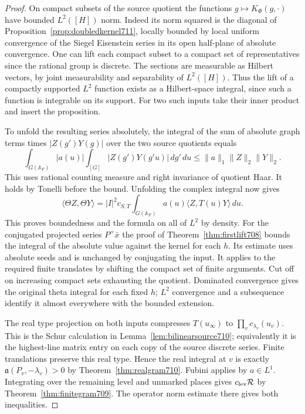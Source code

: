 \documentclass[a4paper,11pt]{article}
\theoremstyle{definition}
\theoremstyle{remark}
\numberwithin{equation}{section}
\begin{document}
\begin{proof}
On compact subsets of the source quotient the functions
\(g\mapsto K_\Phi(g,\cdot)\) have bounded \(L^2([H])\)
norm. Indeed its norm squared is the diagonal of
Proposition~\ref{prop:doubledkernel711}, locally bounded
by local uniform convergence of the Siegel Eisenstein
series in its open half-plane of absolute convergence.
One can lift each compact subset to a compact set of
representatives since the rational group is discrete.
The sections are measurable as Hilbert vectors, by joint
measurability and separability of \(L^2([H])\). Thus the
lift of a compactly supported \(L^2\) function exists
as a Hilbert-space integral, since such a function is
integrable on its support. For two such inputs take
their inner product and insert the proposition.

To unfold the resulting series absolutely, the integral
of the sum of absolute graph terms times \(|Z(g')Y(g)|\)
over the two source quotients equals
\[
 \int_{G(\mathbb A_F)} |a(u)|
      \int_{[G]} |Z(g')Y(g'u)|\,dg'\,du
       \le\|a\|_1\|Z\|_2\|Y\|_2 .
\]
This uses rational counting measure and right invariance
of quotient Haar. It holds by Tonelli before the bound.
Unfolding the complex integral now gives
\[
 \langle\Theta Z,\Theta Y\rangle
   =|I|^2c_{S,T}\int_{G(\mathbb A_F)}a(u)
          \langle Z,T(u)Y\rangle\,du .
\]
This proves boundedness and the formula on all of \(L^2\)
by density. For the conjugated projected series \(P^+\bar x\)
the proof of Theorem~\ref{thm:firstlift708} bounds the
integral of the absolute value against the kernel for each
\(h\). Its estimate uses absolute seeds and is unchanged
by conjugating the input. It applies to the required finite
translates by shifting the compact set of finite arguments.
Cut off on increasing compact sets exhausting the quotient.
Dominated convergence gives the original theta integral for
each fixed \(h\); \(L^2\) convergence and a subsequence
identify it almost everywhere with the bounded extension.

The real type projection on both inputs compresses
\(T(u_\infty)\) to \(\prod_v c_{\lambda_v}(u_v)\).
This is the Schur calculation in Lemma~\ref{lem:bilinearsource710};
equivalently it is the highest-line matrix entry on each
copy of the source discrete series. Finite translations
preserve this real type. Hence the real integral at \(v\)
is exactly \(\mathfrak a(P_v,-\lambda_v)>0\) by
Theorem~\ref{thm:realgram710}. Fubini applies by \(a\in L^1\).
Integrating over the remaining level and unmarked places
gives \(c_{\rm lev}\mathcal R\) by
Theorem~\ref{thm:finitegram709}. The operator norm estimate
there gives both inequalities.
\end{proof}
\end{document}
